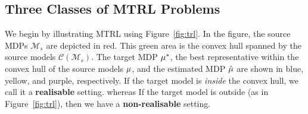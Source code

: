 
\subsection{Three Classes of MTRL Problems}
We begin by illustrating MTRL using Figure~\ref{fig:trl}. In the figure, the source MDPs $\mathcal{M}_s$ are depicted in red. This green area is the convex hull spanned by the source models $\mathcal{C}(\mathcal{M}_s)$. The target MDP $\mu^{*}$, the best representative within the convex hull of the source models $\mu$, and the estimated MDP $\hat{\mu}$ are shown in blue, yellow, and purple, respectively. %
If the target model is \emph{inside} the convex hull, we call it a \textbf{realisable} setting. whereas If the target model is outside (as in Figure~\ref{fig:trl}), then we have a \textbf{non-realisable} setting.

